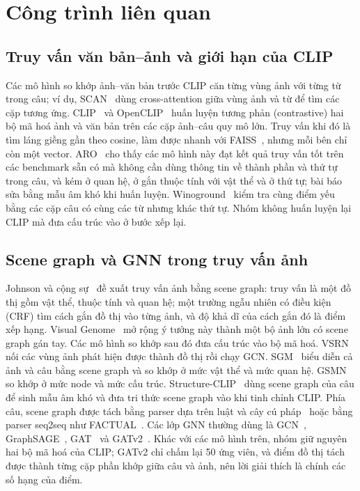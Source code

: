 \section{Công trình liên quan}
\label{sec:related}

\subsection{Truy vấn văn bản--ảnh và giới hạn của CLIP}

Các mô hình so khớp ảnh--văn bản trước CLIP căn từng vùng ảnh với từng từ trong câu; ví dụ, SCAN~\cite{rw-lee2018scan}
dùng cross-attention giữa vùng ảnh và từ để tìm các cặp tương ứng. CLIP~\cite{radford2021clip} và
OpenCLIP~\cite{cherti2023openclip} huấn luyện tương phản (contrastive) hai bộ mã hoá ảnh và văn bản trên các cặp ảnh--câu
quy mô lớn. Truy vấn khi đó là tìm láng giềng gần theo cosine, làm được nhanh với FAISS~\cite{johnson2019faiss}, nhưng
mỗi bên chỉ còn một vector. ARO~\cite{rw-yuksekgonul2023aro} cho thấy các mô hình này đạt kết quả truy vấn tốt trên các
benchmark sẵn có mà không cần dùng thông tin về thành phần và thứ tự trong câu, và kém ở quan hệ, ở gắn thuộc tính với vật
thể và ở thứ tự; bài báo sửa bằng mẫu âm khó khi huấn luyện. Winoground~\cite{rw-thrush2022winoground} kiểm tra cùng điểm
yếu bằng các cặp câu có cùng các từ nhưng khác thứ tự. Nhóm không huấn luyện lại CLIP mà đưa cấu trúc vào ở bước xếp lại.

\subsection{Scene graph và GNN trong truy vấn ảnh}

Johnson và cộng sự~\cite{rw-johnson2015sgretrieval} đề xuất truy vấn ảnh bằng scene graph: truy vấn là một đồ thị gồm vật
thể, thuộc tính và quan hệ; một trường ngẫu nhiên có điều kiện (CRF) tìm cách gắn đồ thị vào từng ảnh, và độ khả dĩ của
cách gắn đó là điểm xếp hạng. Visual Genome~\cite{krishna2017vg} mở rộng ý tưởng này thành một bộ ảnh lớn có scene graph
gán tay. Các mô hình so khớp sau đó đưa cấu trúc vào bộ mã hoá. VSRN~\cite{rw-li2019vsrn} nối các vùng ảnh phát hiện được
thành đồ thị rồi chạy GCN. SGM~\cite{rw-wang2020sgm} biểu diễn cả ảnh và câu bằng scene graph và so khớp ở mức vật thể và
mức quan hệ. GSMN~\cite{rw-liu2020gsmn} so khớp ở mức node và mức cấu trúc. Structure-CLIP~\cite{rw-huang2024structureclip}
dùng scene graph của câu để sinh mẫu âm khó và đưa tri thức scene graph vào khi tinh chỉnh CLIP. Phía câu, scene graph được
tách bằng parser dựa trên luật và cây cú pháp~\cite{schuster2015sgparser} hoặc bằng parser seq2seq như
FACTUAL~\cite{li2023factual}. Các lớp GNN thường dùng là GCN~\cite{rw-kipf2017gcn}, GraphSAGE~\cite{rw-hamilton2017sage},
GAT~\cite{rw-velickovic2018gat} và GATv2~\cite{brody2022gatv2}. Khác với các mô hình trên, nhóm giữ nguyên hai bộ mã hoá
của CLIP; GATv2 chỉ chấm lại 50 ứng viên, và điểm đồ thị tách được thành từng cặp phần khớp giữa câu và ảnh, nên lời giải
thích là chính các số hạng của điểm.

